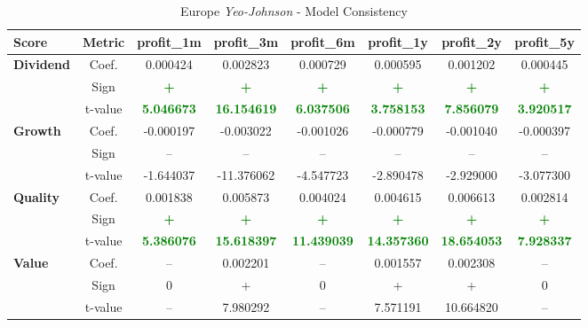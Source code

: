 \documentclass[11pt,english,a4paper,hidelinks]{book}
\begin{document}
\begin{table}[H]
    \centering
    \caption{Europe \textit{Yeo-Johnson} - Model Consistency}
    \begin{tabular}{lccccccc}
        \toprule
        \textbf{Score} & \textbf{Metric} & \textbf{profit\_1m} & \textbf{profit\_3m} & \textbf{profit\_6m} & \textbf{profit\_1y} & \textbf{profit\_2y} & \textbf{profit\_5y} \\
        \midrule
        \multirow{3}{*}{\textbf{Dividend}} 
            & Coef. & 0.000424 & 0.002823 & 0.000729 & 0.000595 & 0.001202 & 0.000445 \\
            & Sign & \textbf{\textcolor{green}{+}} & \textbf{\textcolor{green}{+}} & \textbf{\textcolor{green}{+}} & \textbf{\textcolor{green}{+}} & \textbf{\textcolor{green}{+}} & \textbf{\textcolor{green}{+}} \\
            & t-value & \textbf{\textcolor{green}{5.046673}} & \textbf{\textcolor{green}{16.154619}} & \textbf{\textcolor{green}{6.037506}} & \textbf{\textcolor{green}{3.758153}} & \textbf{\textcolor{green}{7.856079}} & \textbf{\textcolor{green}{3.920517}} \\
        \midrule
        \multirow{3}{*}{\textbf{Growth}} 
            & Coef. & -0.000197 & -0.003022 & -0.001026 & -0.000779 & -0.001040 & -0.000397 \\
            & Sign & – & – & – & – & – & – \\
            & t-value & -1.644037 & -11.376062 & -4.547723 & -2.890478 & -2.929000 & -3.077300 \\
        \midrule
        \multirow{3}{*}{\textbf{Quality}} 
            & Coef. & 0.001838 & 0.005873 & 0.004024 & 0.004615 & 0.006613 & 0.002814 \\
            & Sign & \textbf{\textcolor{green}{+}} & \textbf{\textcolor{green}{+}} & \textbf{\textcolor{green}{+}} & \textbf{\textcolor{green}{+}} & \textbf{\textcolor{green}{+}} & \textbf{\textcolor{green}{+}} \\
            & t-value & \textbf{\textcolor{green}{5.386076}} & \textbf{\textcolor{green}{15.618397}} & \textbf{\textcolor{green}{11.439039}} & \textbf{\textcolor{green}{14.357360}} & \textbf{\textcolor{green}{18.654053}} & \textbf{\textcolor{green}{7.928337}} \\
        \midrule
        \multirow{3}{*}{\textbf{Value}} 
            & Coef. & -- & 0.002201 & -- & 0.001557 & 0.002308 & -- \\
            & Sign & 0 & + & 0 & + & + & 0 \\
            & t-value & -- & 7.980292 & -- & 7.571191 & 10.664820 & -- \\
        \bottomrule
    \end{tabular}
    \label{tab:eu_gaussian_model_consistency}
\end{table}
\end{document}
